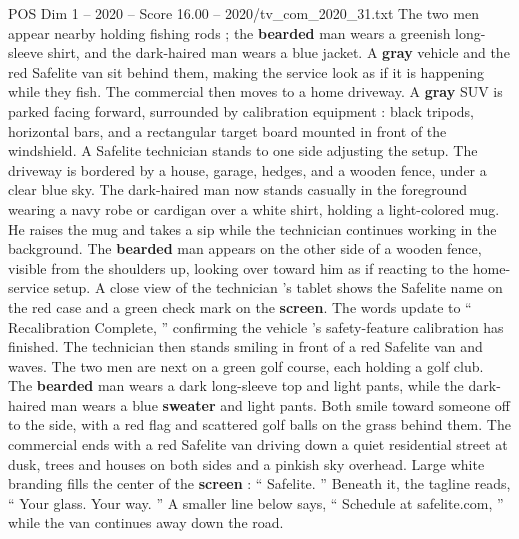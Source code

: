 \begin{textsample}{POS Dim 1 – 2020 – Score 16.00 – 2020/tv\_com\_2020\_31.txt}
The two men appear nearby holding fishing rods ; the \textbf{bearded} man wears a greenish long-sleeve shirt, and the dark-haired man wears a blue jacket.
A \textbf{gray} vehicle and the red Safelite van sit behind them, making the service look as if it is happening while they fish.
The commercial then moves to a home driveway.
A \textbf{gray} SUV is parked facing forward, surrounded by calibration equipment : black tripods, horizontal bars, and a rectangular target board mounted in front of the windshield.
A Safelite technician stands to one side adjusting the setup.
The driveway is bordered by a house, garage, hedges, and a wooden fence, under a clear blue sky.
The dark-haired man now stands casually in the foreground wearing a navy robe or cardigan over a white shirt, holding a light-colored mug.
He raises the mug and takes a sip while the technician continues working in the background.
The \textbf{bearded} man appears on the other side of a wooden fence, visible from the shoulders up, looking over toward him as if reacting to the home-service setup.
A close view of the technician ’s tablet shows the Safelite name on the red case and a green check mark on the \textbf{screen}.
The words update to “ Recalibration Complete, ” confirming the vehicle ’s safety-feature calibration has finished.
The technician then stands smiling in front of a red Safelite van and waves.
The two men are next on a green golf course, each holding a golf club.
The \textbf{bearded} man wears a dark long-sleeve top and light pants, while the dark-haired man wears a blue \textbf{sweater} and light pants.
Both smile toward someone off to the side, with a red flag and scattered golf balls on the grass behind them.
The commercial ends with a red Safelite van driving down a quiet residential street at dusk, trees and houses on both sides and a pinkish sky overhead.
Large white branding fills the center of the \textbf{screen} : “ Safelite. ” Beneath it, the tagline reads, “ Your glass.
Your way. ” A smaller line below says, “ Schedule at safelite.com, ” while the van continues away down the road.

\end{textsample}

